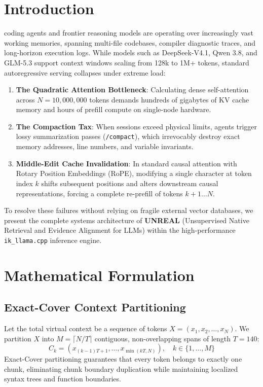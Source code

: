 \documentclass[10pt,journal,compsoc]{IEEEtran}
\begin{document}
\section{Introduction}
 coding agents and frontier reasoning models are operating over increasingly vast working memories, spanning multi-file codebases, compiler diagnostic traces, and long-horizon execution logs. While models such as DeepSeek-V4.1, Qwen 3.8, and GLM-5.3 support context windows scaling from 128k to 1M+ tokens, standard autoregressive serving collapses under extreme load:
\begin{enumerate}
    \item \textbf{The Quadratic Attention Bottleneck}: Calculating dense self-attention across $N = 10,000,000$ tokens demands hundreds of gigabytes of KV cache memory and hours of prefill compute on single-node hardware.
    \item \textbf{The Compaction Tax}: When sessions exceed physical limits, agents trigger lossy summarization passes (\texttt{/compact}), which irrevocably destroy exact memory addresses, line numbers, and variable invariants.
    \item \textbf{Middle-Edit Cache Invalidation}: In standard causal attention with Rotary Position Embeddings (RoPE), modifying a single character at token index $k$ shifts subsequent positions and alters downstream causal representations, forcing a complete re-prefill of tokens $k+1 \dots N$.
\end{enumerate}

To resolve these failures without relying on fragile external vector databases, we present the complete systems architecture of \textbf{UNREAL} (Unsupervised Native Retrieval and Evidence Alignment for LLMs) within the high-performance \texttt{ik\_llama.cpp} inference engine.

\section{Mathematical Formulation}

\subsection{Exact-Cover Context Partitioning}
Let the total virtual context be a sequence of tokens $X = (x_1, x_2, \dots, x_N)$. We partition $X$ into $M = \lceil N/T \rceil$ contiguous, non-overlapping spans of length $T = 140$:
\begin{equation}
C_k = (x_{(k-1)T + 1}, \dots, x_{\min(kT, N)}), \quad k \in \{1, \dots, M\}
\end{equation}
Exact-Cover partitioning guarantees that every token belongs to exactly one chunk, eliminating chunk boundary duplication while maintaining localized syntax trees and function boundaries.
\end{document}
